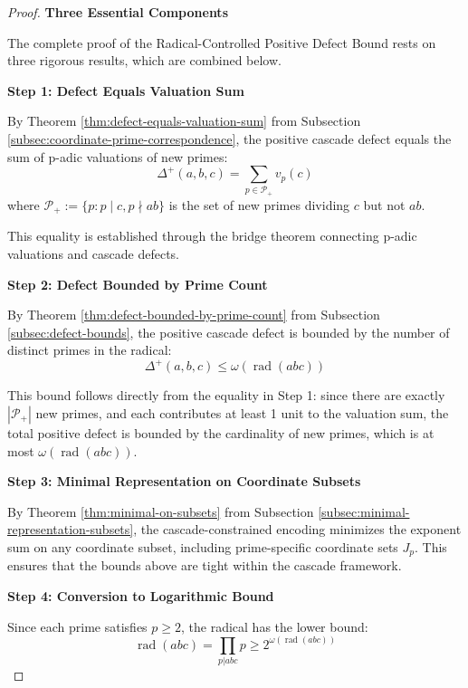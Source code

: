 \begin{proof}

\noindent \textbf{Three Essential Components}

The complete proof of the Radical-Controlled Positive Defect Bound rests on three rigorous results, which are combined below.

\noindent \textbf{Step 1: Defect Equals Valuation Sum}

By Theorem \ref{thm:defect-equals-valuation-sum} from Subsection \ref{subsec:coordinate-prime-correspondence}, the positive cascade defect equals the sum of p-adic valuations of new primes:
\begin{equation}
\Delta^+(a,b,c) = \sum_{p \in \mathcal{P}_+} v_p(c)
\end{equation}
where $\mathcal{P}_+ := \{p : p \mid c, p \nmid ab\}$ is the set of new primes dividing $c$ but not $ab$.

This equality is established through the bridge theorem connecting p-adic valuations and cascade defects.

\noindent \textbf{Step 2: Defect Bounded by Prime Count}

By Theorem \ref{thm:defect-bounded-by-prime-count} from Subsection \ref{subsec:defect-bounds}, the positive cascade defect is bounded by the number of distinct primes in the radical:
\begin{equation}
\Delta^+(a,b,c) \leq \omega(\operatorname{rad}(abc))
\end{equation}

This bound follows directly from the equality in Step 1: since there are exactly $|\mathcal{P}_+|$ new primes, and each contributes at least 1 unit to the valuation sum, the total positive defect is bounded by the cardinality of new primes, which is at most $\omega(\operatorname{rad}(abc))$.

\noindent \textbf{Step 3: Minimal Representation on Coordinate Subsets}

By Theorem \ref{thm:minimal-on-subsets} from Subsection \ref{subsec:minimal-representation-subsets}, the cascade-constrained encoding minimizes the exponent sum on any coordinate subset, including prime-specific coordinate sets $J_p$. This ensures that the bounds above are tight within the cascade framework.

\noindent \textbf{Step 4: Conversion to Logarithmic Bound}

Since each prime satisfies $p \geq 2$, the radical has the lower bound:
\begin{equation}
\operatorname{rad}(abc) = \prod_{p | abc} p \geq 2^{\omega(\operatorname{rad}(abc))}
\end{equation}


\end{proof}
